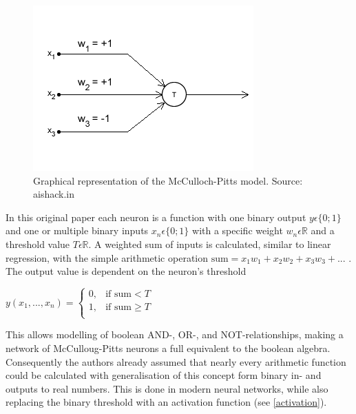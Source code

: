 \begin{figure}[h]
    \centering
	\includegraphics[width=.7\textwidth]{./images/illustrations/mcculloch-pitts}
    \caption{Graphical representation of the McCulloch-Pitts model. Source: aishack.in}
    \label{fig:mcculloch-pitts}
\end{figure}


In this original paper each neuron is a function with one binary output $y \epsilon \{0;1\}$ and one or multiple binary inputs $x_n \epsilon \{0;1\}$ with a specific weight $w_n \epsilon \mathbb{R}$ and a threshold value $T \epsilon \mathbb{R}$. A weighted sum of inputs is calculated, similar to linear regression, with the simple arithmetic operation $\text{sum} = x_1w_1 + x_2w_2 + x_3w_3 + ...$ . The output value is dependent on the neuron's threshold

{\centering
	$y(x_1, ..., x_n) = \begin{cases}
    0,& \text{if } \text{sum} < T\\
    1,& \text{if } \text{sum} \geq T\\
	\end{cases}$
	\par
}

This allows modelling of boolean AND-, OR-, and NOT-relationships, making a network of McCulloug-Pitts neurons a full equivalent to the boolean algebra. Consequently the authors already assumed that nearly every arithmetic function could be calculated with generalisation of this concept form binary in- and outputs to real numbers. This is done in modern neural networks, while also replacing the binary threshold with an activation function (see \ref{activation}).

